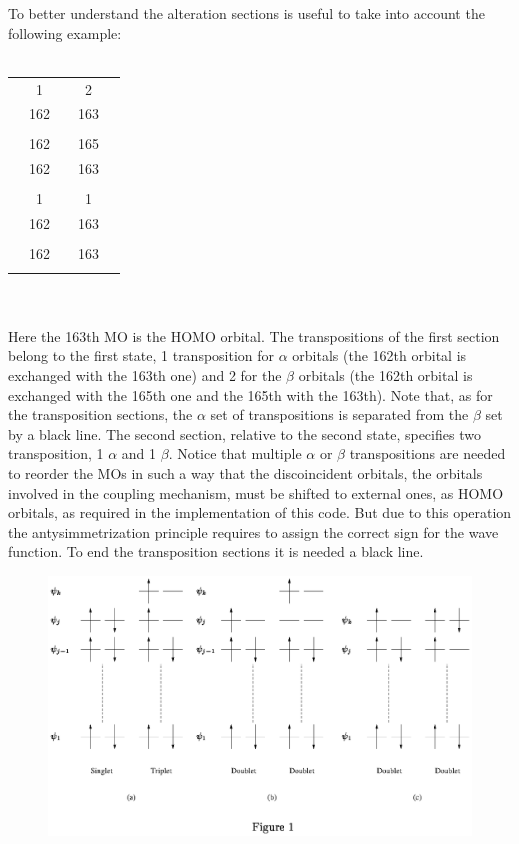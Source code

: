 \documentclass[a4paper,12pt]{article}
\begin{document}
To better understand the alteration sections is useful to take into account the following example: \\ \\
\begin{tabular}{ccccc}
 & 1   & & 2   &  \\
 & 162 & & 163 &  \\
 &     & &     &  \\
 & 162 & & 165 &  \\
 & 162 & & 163 &  \\
 &     & &     &  \\
 & 1   & & 1   &  \\
 & 162 & & 163 &  \\
 &     & &     &  \\
 & 162 & & 163 &  \\
 &     & &     &  \\
\end{tabular} \\ \\
Here the 163th MO is the HOMO orbital. The transpositions of the first section belong to the first state, 1 transposition
for $\alpha$ orbitals (the 162th orbital is exchanged with the 163th one) and 2 for the $\beta$ orbitals
(the 162th orbital is exchanged with the 165th one and the 165th with the 163th). Note that, as for the
transposition sections, the $\alpha$ set of transpositions is separated from the $\beta$ set by a black line.
The second section, relative to the second state, specifies two transposition, 1 $\alpha$ and 1 $\beta$.
Notice that multiple $\alpha$ or $\beta$ transpositions are needed to reorder the MOs in such a way that
the discoincident orbitals, the orbitals involved in the coupling mechanism, must be shifted to external ones,
as HOMO orbitals, as required in the implementation of this code\cite{Chiod1}. But due to this operation
the antysimmetrization principle requires to assign the correct sign for the wave function. To end 
the transposition sections it is needed a black line.
%
\begin{figure}
\vspace*{-12.0 cm}
\begin{minipage}{\textwidth}
\hspace*{-3.0 cm}  \includegraphics{Figure1.ps}
\end{minipage}
\end{figure} 
\end{document}
